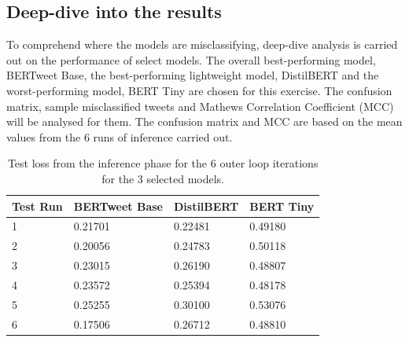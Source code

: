 \subsection{Deep-dive into the results}
To comprehend where the models are misclassifying, deep-dive analysis is carried out on the performance of select models. The overall best-performing model, BERTweet Base, the best-performing lightweight model, DistilBERT and the worst-performing model, BERT Tiny are chosen for this exercise. The confusion matrix, sample misclassified tweets and Mathews Correlation Coefficient (MCC) will be analysed for them. The confusion matrix and MCC are based on the mean values from the 6 runs of inference carried out.\\
\begin{table}[ht]
    \centering
    \begin{tabularx}{\textwidth}{|X|X|X|X|}
        \hline
        \rowcolor[gray]{0.7}
        \textbf{Test Run} & \textbf{BERTweet Base} & \textbf{DistilBERT} & \textbf{BERT Tiny} \\
        \hline
        1                 & 0.21701                & 0.22481             & 0.49180            \\
        \rowcolor[gray]{0.9}
        2                 & 0.20056                & 0.24783             & 0.50118            \\
        3                 & 0.23015                & 0.26190             & 0.48807            \\
        \rowcolor[gray]{0.9}
        4                 & 0.23572                & 0.25394             & 0.48178            \\
        5                 & 0.25255                & 0.30100             & 0.53076            \\
        \rowcolor[gray]{0.9}
        6                 & 0.17506                & 0.26712             & 0.48810            \\
        \hline
    \end{tabularx}
    \caption{Test loss from the inference phase for the 6 outer loop iterations for the 3 selected models.}
    \label{tab: test_loss}
\end{table}


